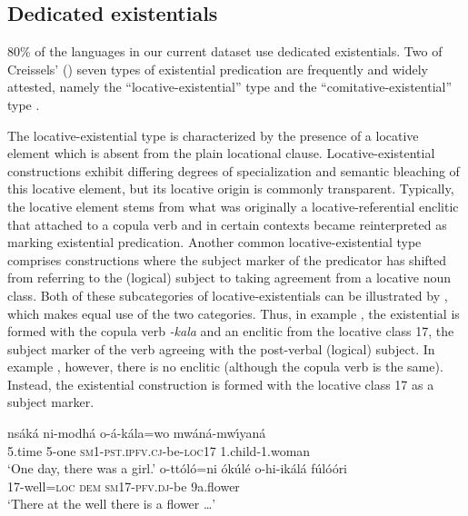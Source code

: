 \documentclass[output=paper,draft,draftmode,colorlinks,citecolor=brown]{langscibook}
\begin{document}
\subsection{Dedicated existentials}\label{sec:1:3.2}
80\% of the languages in our current dataset use dedicated existentials. Two of Creissels' (\citeyear{Creissels2014,Creissels2015}) seven types of existential predication are frequently and widely attested, namely the ``locative-existential'' type and the ``comitative-exis\-ten\-tial'' type \citep{BernanderDevos2018}.

The locative-existential type is characterized by the presence of a
locative element which is absent from the plain locational clause.
Locative-existential constructions exhibit differing degrees of
specialization and semantic bleaching of this locative element, but its
locative origin is commonly transparent. Typically, the locative element
stems from what was originally a locative-referential enclitic that
attached to a copula verb and in certain contexts became reinterpreted as
marking existential predication. Another common locative-existential type comprises constructions where the subject marker of the predicator has shifted from referring to the (logical) subject to taking agreement from a locative noun class. Both of these subcategories of locative-existentials can be illustrated by , which makes equal use of the two categories. Thus, in example , the existential is formed with the copula verb \textit{-kala} and an enclitic from the locative class 17, the subject marker of the verb agreeing with the post-verbal (logical) subject. In example , however, there is no enclitic (although the copula verb is the same). Instead, the existential construction is formed with the locative class 17 as a subject marker.

\ea\label{ex:cuwabo-girl-flower}

\ea\label{ex:cuwabo-girl}
\gll nsák\'a ni-modh\'a o-á-kála=wo mwáná-mw{\'\i}yan\'a\\
	5.time 5-one \textsc{sm}1-\textsc{pst.ipfv.cj}-be-\textsc{loc}17 1.child-1.woman\\
\glt `One day, there was a girl.'
\ex\label{ex:cuwabo-flower}
\gll o-tt{\'o}l{\'o}=ni {\'o}kúlé o-hi-ikál\'a fúl{\'o}{\'o}ri\\
	17-well=\textsc{loc} \textsc{dem} \textsc{sm}17-\textsc{pfv.dj}-be   9a.flower\\
\glt `There at the well there is a flower \ldots{}'
\z
\z
\end{document}
